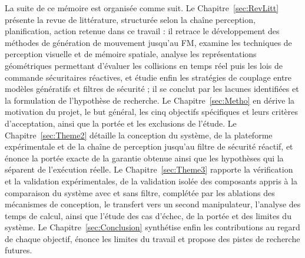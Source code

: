 La suite de ce mémoire est organisée comme suit. Le Chapitre~\ref{sec:RevLitt} présente la revue de littérature, structurée selon la chaîne perception, planification, action retenue dans ce travail : il retrace le développement des méthodes de génération de mouvement jusqu'au \ac{FM}, examine les techniques de perception visuelle et de mémoire spatiale, analyse les représentations géométriques permettant d'évaluer les collisions en temps réel puis les lois de commande sécuritaires réactives, et étudie enfin les stratégies de couplage entre modèles génératifs et filtres de sécurité ; il se conclut par les lacunes identifiées et la formulation de l'hypothèse de recherche. Le Chapitre~\ref{sec:Metho} en dérive la motivation du projet, le but général, les cinq objectifs spécifiques et leurs critères d'acceptation, ainsi que la portée et les exclusions de l'étude. Le Chapitre~\ref{sec:Theme2} détaille la conception du système, de la plateforme expérimentale et de la chaîne de perception jusqu'au filtre de sécurité réactif, et énonce la portée exacte de la garantie obtenue ainsi que les hypothèses qui la séparent de l'exécution réelle. Le Chapitre~\ref{sec:Theme3} rapporte la vérification et la validation expérimentales, de la validation isolée des composants appris à la comparaison du système avec et sans filtre, complétée par les ablations des mécanismes de conception, le transfert vers un second manipulateur, l'analyse des temps de calcul, ainsi que l'étude des cas d'échec, de la portée et des limites du système. Le Chapitre~\ref{sec:Conclusion} synthétise enfin les contributions au regard de chaque objectif, énonce les limites du travail et propose des pistes de recherche futures.
